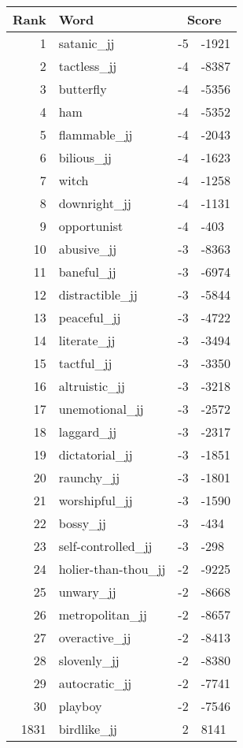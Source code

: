 \begin{longtable}[!htbp]{| rlr@{.}l |}
    \hline
    \textbf{Rank} & \textbf{Word} & \multicolumn{2}{c|}{\textbf{Score}} \\
    \hline
    \endhead
    1 & satanic\_jj & -5 & -1921 \\
    2 & tactless\_jj & -4 & -8387 \\
    3 & butterfly & -4 & -5356 \\
    4 & ham & -4 & -5352 \\
    5 & flammable\_jj & -4 & -2043 \\
    6 & bilious\_jj & -4 & -1623 \\
    7 & witch & -4 & -1258 \\
    8 & downright\_jj & -4 & -1131 \\
    9 & opportunist & -4 & -403 \\
    10 & abusive\_jj & -3 & -8363 \\
    11 & baneful\_jj & -3 & -6974 \\
    12 & distractible\_jj & -3 & -5844 \\
    13 & peaceful\_jj & -3 & -4722 \\
    14 & literate\_jj & -3 & -3494 \\
    15 & tactful\_jj & -3 & -3350 \\
    16 & altruistic\_jj & -3 & -3218 \\
    17 & unemotional\_jj & -3 & -2572 \\
    18 & laggard\_jj & -3 & -2317 \\
    19 & dictatorial\_jj & -3 & -1851 \\
    20 & raunchy\_jj & -3 & -1801 \\
    21 & worshipful\_jj & -3 & -1590 \\
    22 & bossy\_jj & -3 & -434 \\
    23 & self-controlled\_jj & -3 & -298 \\
    24 & holier-than-thou\_jj & -2 & -9225 \\
    25 & unwary\_jj & -2 & -8668 \\
    26 & metropolitan\_jj & -2 & -8657 \\
    27 & overactive\_jj & -2 & -8413 \\
    28 & slovenly\_jj & -2 & -8380 \\
    29 & autocratic\_jj & -2 & -7741 \\
    30 & playboy & -2 & -7546 \\
    1831 & birdlike\_jj & 2 & 8141 \\

\end{longtable}
